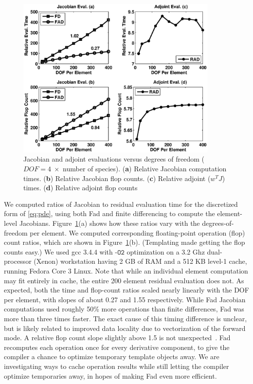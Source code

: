 \documentclass{llncs}
\begin{document}
\begin{figure}[tb]
  \begin{center}
    \includegraphics[width=10cm]{perf.eps}
    \caption{Jacobian and adjoint evaluations versus
    degrees of freedom ($DOF = 4 \; \times$ number of
    species). ({\bf a}) Relative Jacobian computation times.
    ({\bf b}) Relative Jacobian flop counts.  ({\bf c})
    Relative adjoint ($w^T J$) times. ({\bf d}) Relative adjoint flop counts}
    \label{figure:performance}
  \end{center}
\end{figure}
We computed ratios of Jacobian to residual evaluation time for the
discretized form of \eqref{eq:pde}, using both
Fad and finite differencing to compute the element-level Jacobians.
Figure~\ref{figure:performance}(a) shows how these ratios
vary with the
degrees-of-freedom per element.
We computed corresponding floating-point operation (flop) count ratios,
which are shown in Figure~\ref{figure:performance}(b).
(Templating made getting the flop counts easy.)
We used gcc 3.4.4 with $\texttt{-O2}$ optimization on a 3.2 Ghz dual-processor (Xenon)
workstation having 2 GB of RAM and a 512 KB level-1 cache, running Fedora Core 3
Linux.
Note that while an individual element computation may fit entirely in cache,
the entire 200 element residual evaluation does not.
As expected, both the time and flop-count ratios scaled nearly linearly with
the DOF per element, with slopes of about 0.27 and 1.55
respectively.  While Fad Jacobian computations used
roughly 50\% more operations than finite differences, Fad
was more than three times faster.  The exact cause of this timing difference is unclear, but is
likely related to improved data locality due to vectorization of the
forward mode.  A relative flop
count slope slightly
above 1.5 is not unexpected~\cite{Griewank2000EDP}.
Fad recomputes each operation once for every
derivative component, to give the compiler a
chance to optimize temporary template objects away.  We are investigating ways
to cache operation results while still letting the compiler
optimize temporaries away, in hopes
of making Fad even more efficient.
\end{document}

